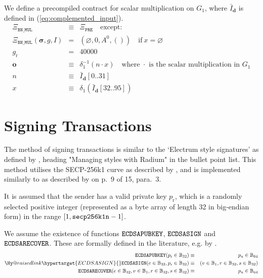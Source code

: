 \documentclass[9pt,oneside]{amsart}
\makeatletter
\newcommand{\linkdest}[1]{\Hy@raisedlink{\hypertarget{#1}{}}}
\newcommand*\eg{e.g.\@\xspace}
\makeatother
\begin{document}
We define a precompiled contract for scalar multiplication on $G_1$, where $\bar I_{\mathbf{d}}$ is defined in (\ref{eq:complemented_input}).
\begin{eqnarray}
\Xi_{\mathtt{BN\_MUL}}&\equiv&\Xi_{\mathtt{PRE}}\quad\text{except:}\\
\Xi_{\mathtt{BN\_MUL}}(\boldsymbol\sigma,g,I)&=&\left(\varnothing,0,A^0,()\right)\quad\text{if}\ x=\varnothing\\
g_{\mathrm{r}} &=& 40000\\
\mathbf{o}&\equiv&\delta_1^{-1}(n\cdot x)\quad\text{where $\cdot$ is the scalar multiplication in $G_1$}\\
n&\equiv&\bar I_{\mathbf{d}}[0..31]\\
x&\equiv&\delta_1\left(\bar I_{\mathbf{d}}[32..95]\right)
\end{eqnarray}

\section{Signing Transactions}\label{app:signing}

The method of signing transactions is similar to the `Electrum style signatures' as defined by \cite{npmElectrum2017}, heading "Managing styles with Radium" in the bullet point list. This method utilises the SECP-256k1 curve as described by \cite{Courtois2014}, and is implemented similarly to as described by \cite{gura2004comparing} on p.~9 of 15, para.~3.

It is assumed that the sender has a valid private key $p_{\mathrm{r}}$, which is a randomly selected positive integer (represented as a byte array of length 32 in big-endian form) in the range \hbox{$[1, \mathtt{\tiny secp256k1n} - 1]$}.

We assume the existence of functions $\mathtt{\small ECDSAPUBKEY}$, $\mathtt{\small ECDSASIGN}$ and $\mathtt{\small ECDSARECOVER}$. These are formally defined in the literature, \eg by \cite{ECDSAcerticom}.
\begin{eqnarray}
\mathtt{\small ECDSAPUBKEY}(p_{\mathrm{r}} \in \mathbb{B}_{32}) & \equiv & p_{\mathrm{u}} \in \mathbb{B}_{64} \\
\linkdest{ECDSASIGN}\mathtt{\small ECDSASIGN}(e \in \mathbb{B}_{32}, p_{\mathrm{r}} \in \mathbb{B}_{32}) & \equiv & (v \in \mathbb{B}_{1}, r \in \mathbb{B}_{32}, s \in \mathbb{B}_{32}) \\
\mathtt{\small ECDSARECOVER}(e \in \mathbb{B}_{32}, v \in \mathbb{B}_{1}, r \in \mathbb{B}_{32}, s \in \mathbb{B}_{32}) & \equiv & p_{\mathrm{u}} \in \mathbb{B}_{64}
\end{eqnarray}
\end{document}
